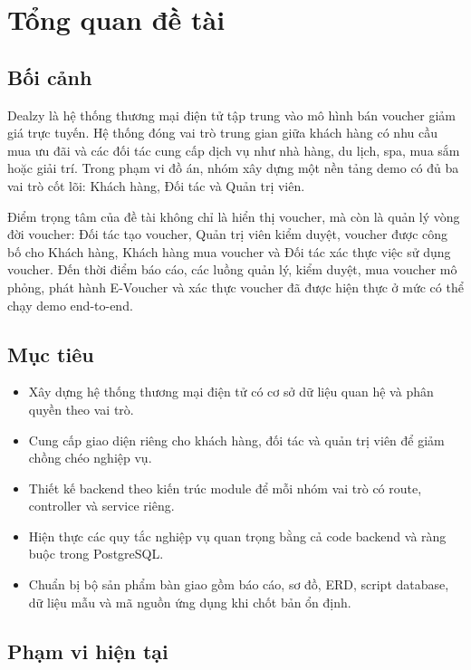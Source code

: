 \chapter{Tổng quan đề tài}

\section{Bối cảnh}

Dealzy là hệ thống thương mại điện tử tập trung vào mô hình bán voucher giảm giá trực tuyến. Hệ thống đóng vai trò trung gian giữa khách hàng có nhu cầu mua ưu đãi và các đối tác cung cấp dịch vụ như nhà hàng, du lịch, spa, mua sắm hoặc giải trí. Trong phạm vi đồ án, nhóm xây dựng một nền tảng demo có đủ ba vai trò cốt lõi: Khách hàng, Đối tác và Quản trị viên.

Điểm trọng tâm của đề tài không chỉ là hiển thị voucher, mà còn là quản lý vòng đời voucher: Đối tác tạo voucher, Quản trị viên kiểm duyệt, voucher được công bố cho Khách hàng, Khách hàng mua voucher và Đối tác xác thực việc sử dụng voucher. Đến thời điểm báo cáo, các luồng quản lý, kiểm duyệt, mua voucher mô phỏng, phát hành E-Voucher và xác thực voucher đã được hiện thực ở mức có thể chạy demo end-to-end.

\section{Mục tiêu}

\begin{itemize}[leftmargin=1.2cm]
    \item Xây dựng hệ thống thương mại điện tử có cơ sở dữ liệu quan hệ và phân quyền theo vai trò.
    \item Cung cấp giao diện riêng cho khách hàng, đối tác và quản trị viên để giảm chồng chéo nghiệp vụ.
    \item Thiết kế backend theo kiến trúc module để mỗi nhóm vai trò có route, controller và service riêng.
    \item Hiện thực các quy tắc nghiệp vụ quan trọng bằng cả code backend và ràng buộc trong PostgreSQL.
    \item Chuẩn bị bộ sản phẩm bàn giao gồm báo cáo, sơ đồ, ERD, script database, dữ liệu mẫu và mã nguồn ứng dụng khi chốt bản ổn định.
\end{itemize}

\section{Phạm vi hiện tại}

